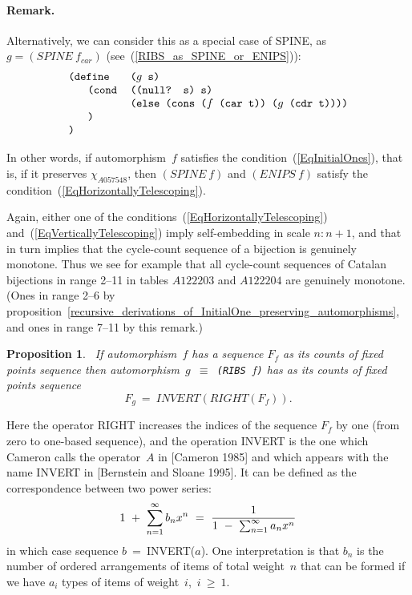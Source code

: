 \documentclass[11pt]{article} %
\newtheorem{propo}{Proposition}
\newcommand{\eqn}[1]{(\ref{#1})}
\newcommand{\eeq}{\end{equation}}
\newcommand{\beql}[1]{\begin{equation}\label{#1}}
\newcommand{\autletter}[1]{$#1$}
\newcommand{\automorphismlet}[1]{automorphism~\autletter{#1}}
\newcommand{\charfun}[1]{\ensuremath{\chi_{{#1}}}}
\newcommand{\charfunforcdrnil}{\charfun{A057548}}
\newcommand{\scmcode}[1]{{\tt{#1}}}
\newcommand{\scmcodeintext}[1]{{\tt{#1}}}
\newenvironment{scmdefinefun7}{\begin{tabular}{l l l l l l l}}{\end{tabular}}
\begin{document}
\paragraph{Remark.}
Alternatively, we can consider this as a special case of SPINE, as $g = (SPINE~f_{car})$
(see~\eqn{RIBS_as_SPINE_or_ENIPS}):
\beql{SchemeCodeFor_g_SPINE_f_car}
\begin{scmdefinefun7}

\multicolumn{2}{l}{\scmcode{(define}} & \multicolumn{2}{l}{\scmcode{($g$ s)}}\\
 & \scmcode{(cond} & \multicolumn{3}{l}{\scmcode{((null? s) s)}}\\
 &                 & \multicolumn{3}{l}{\scmcode{(else (cons ($f$ (car t)) ($g$ (cdr t))))}}\\
& \scmcode{)}\\
\scmcode{)}\\

\end{scmdefinefun7}
\eeq

In other words, if  \automorphismlet{f} satisfies the condition~\eqn{EqInitialOnes},
that is, if it preserves {\charfunforcdrnil},
then $(SPINE~f)$ and $(ENIPS~f)$ satisfy the
condition~\eqn{EqHorizontallyTelescoping}.

Again, either one of the conditions~\eqn{EqHorizontallyTelescoping}
and~\eqn{EqVerticallyTelescoping} imply self-embedding in scale $n:n+1$,
and that in turn implies that the cycle-count sequence of a bijection
is genuinely monotone.
Thus we see for example that all cycle-count sequences of
Catalan bijections in range 2--11 in tables $A122203$ and $A122204$
are genuinely monotone.
(Ones in range 2--6 by proposition~\ref{recursive_derivations_of_InitialOne_preserving_automorphisms},
and ones in range 7--11 by this remark.)


\begin{propo}~\label{MAP_INVERT}
If \automorphismlet{f} has a sequence $F_f$ as its counts of fixed points sequence
then \automorphismlet{g}~$\equiv$~\scmcodeintext{(RIBS~$f$)}
has as its counts of fixed points sequence
$$
F_g~=~INVERT(RIGHT(F_f)).
$$

\end{propo}
Here the operator RIGHT increases the indices of the sequence $F_f$ by
one (from zero to one-based sequence),
and the operation INVERT is the one which Cameron calls the operator~$A$ in [Cameron 1985]
and which appears with the name INVERT in [Bernstein and Sloane 1995].
It can be defined as the correspondence between two power series:
$$
1~+~\sum_{n=1}^{\infty} b_n x^n~=~{1\over1~-~\sum_{n=1}^{\infty} a_n x^n}
$$
in which case sequence $b$~=~INVERT($a$). One interpretation is that $b_n$ is the number
of ordered arrangements of items of total weight~$n$ %
that can be formed if we have $a_i$ types of items of
weight~$i$,~$i~{\geq}~1$.
\end{document}
